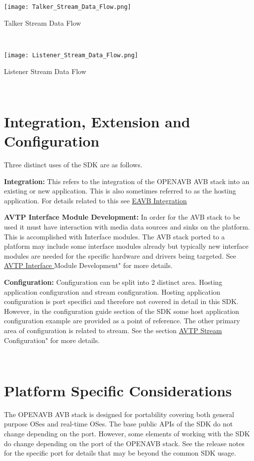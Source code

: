 \begin{DoxyImage}
\texttt{[image: Talker\_Stream\_Data\_Flow.png]}
\caption{Talker Stream Data Flow}
\end{DoxyImage}


~\newline



\begin{DoxyImage}
\texttt{[image: Listener\_Stream\_Data\_Flow.png]}
\caption{Listener Stream Data Flow}
\end{DoxyImage}


~\newline
\hypertarget{sdk_overview_sdk_overview_integration}{}\section{Integration, Extension and Configuration }\label{sdk_overview_sdk_overview_integration}
Three distinct uses of the S\+DK are as follows.

{\bfseries Integration\+:} This refers to the integration of the O\+P\+E\+N\+A\+VB A\+VB stack into an existing or new application. This is also sometimes referred to as the hosting application. For details related to this see \hyperlink{sdk_integration}{E\+A\+VB Integration}

{\bfseries A\+V\+TP Interface Module Development\+:} In order for the A\+VB stack to be used it must have interaction with media data sources and sinks on the platform. This is accomplished with Interface modules. The A\+VB stack ported to a platform may include some interface modules already but typically new interface modules are needed for the specific hardware and drivers being targeted. See \hyperlink{sdk_avtp_interface_module_dev}{A\+V\+TP Interface }Module Development" for more details.

{\bfseries Configuration\+:} Configuration can be split into 2 distinct area. Hosting application configuration and stream configuration. Hosting application configuration is port specifici and therefore not covered in detail in this S\+DK. However, in the configuration guide section of the S\+DK some host application configuration example are provided as a point of reference. The other primary area of configuration is related to stream. See the section \hyperlink{sdk_avtp_stream_cfg}{A\+V\+TP Stream }Configuration" for more details.

~\newline
\hypertarget{sdk_overview_sdk_overview_platform}{}\section{Platform Specific Considerations }\label{sdk_overview_sdk_overview_platform}
The O\+P\+E\+N\+A\+VB A\+VB stack is designed for portability covering both general purpose O\+Ses and real-\/time O\+Ses. The base public A\+P\+Is of the S\+DK do not change depending on the port. However, some elements of working with the S\+DK do change depending on the port of the O\+P\+E\+N\+A\+VB stack. See the release notes for the specific port for details that may be beyond the common S\+DK usage.

